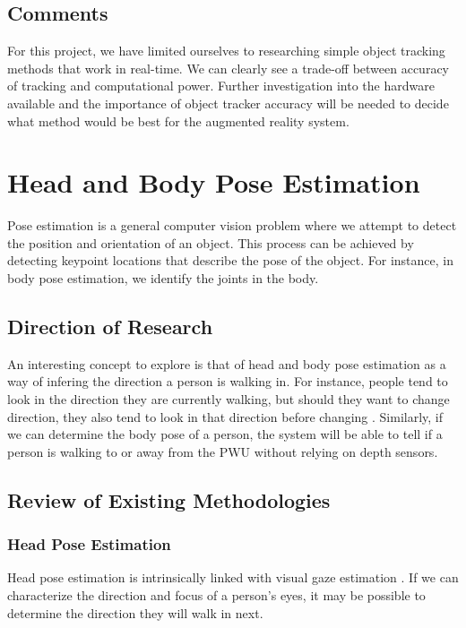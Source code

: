 \subsection{Comments}
For this project, we have limited ourselves to researching simple object tracking methods that work in real-time. We can clearly see a trade-off between accuracy of tracking and computational power. Further investigation into the hardware available and the importance of object tracker accuracy will be needed to decide what method would be best for the augmented reality system.

\section{Head and Body Pose Estimation}
Pose estimation is a general computer vision problem where we attempt to detect the position and orientation of an object. This process can be achieved by detecting keypoint locations that describe the pose of the object. For instance, in body pose estimation, we identify the joints in the body.

\subsection{Direction of Research}
An interesting concept to explore is that of head and body pose estimation as a way of infering the direction a person is walking in. For instance, people tend to look in the direction they are currently walking, but should they want to change direction, they also tend to look in that direction before changing \cite{Valenti2012}. Similarly, if we can determine the body pose of a person, the system will be able to tell if a person is walking to or away from the PWU without relying on depth sensors.

\subsection{Review of Existing Methodologies}

\subsubsection{Head Pose Estimation}
Head pose estimation is intrinsically linked with visual gaze estimation \cite{Murphy-Chutorian2009}. If we can characterize the direction and focus of a person's eyes, it may be possible to determine the direction they will walk in next.

